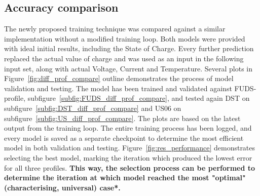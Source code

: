 \subsection{Accuracy comparison}
    The newly proposed training technique was compared against a similar implementation without a modified training loop.
    Both models were provided with ideal initial results, including the State of Charge.
    Every further prediction replaced the actual value of charge and was used as an input in the following input set, along with actual Voltage, Current and Temperature.
    Several plots in Figure~\ref{fig:diff_prof_compare} outline demonstrates the process of model validation and testing.
    The model has been trained and validated against FUDS-profile, subfigure~\ref{subfig:FUDS_diff_prof_compare}, and tested again DST on subfigure~\ref{subfig:DST_diff_prof_compare} and US06 on subfigure~\ref{subfig:US_diff_prof_compare}.
    The plots are based on the latest output from the training loop.
    The entire training process has been logged, and every model is saved as a separate checkpoint to determine the most efficient model in both validation and testing.
    Figure~\ref{fig:res_performance} demonstrates selecting the best model, marking the iteration which produced the lowest error for all three profiles.
    \textbf{This way, the selection process can be performed to determine the iteration at which model reached the most "optimal" (characterising, universal) case*.}

